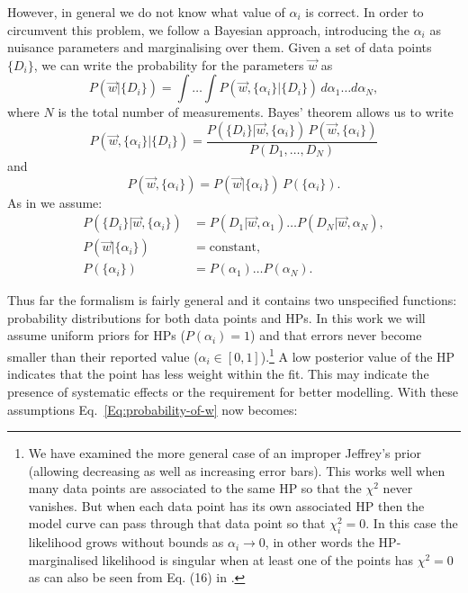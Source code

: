 However, in general we do not know what value of $\alpha_i$ is correct. In order to circumvent this problem, 
we follow a Bayesian approach, introducing the $\alpha_i$ as nuisance parameters and marginalising over them. Given a set of data points $ \lbrace D_i \rbrace$, we can write the probability for the parameters $\vec{w}$  as
\begin{equation}\label{Eq:probability-of-w}
P(\vec{w}|\lbrace D_i \rbrace) = \int \dots \int P(\vec{w},\lbrace \alpha_i \rbrace|\lbrace D_i \rbrace)\, d\alpha_1 \dots d\alpha_N,
\end{equation}
where $N$ is the total number of measurements. Bayes' theorem allows us to write 
\begin{equation}\label{Eq:probability-of-w-alphas-1}
P(\vec{w},\lbrace \alpha_i \rbrace|\lbrace D_i \rbrace) = \frac{P(\lbrace D_i \rbrace|\vec{w},\lbrace \alpha_i \rbrace)\, P(\vec{w},\lbrace \alpha_i \rbrace)}{P(D_1,\dots,D_N)}
\end{equation}
and 
\begin{equation}\label{Eq:probability-of-w-alphas-2}
P(\vec{w},\lbrace \alpha_i \rbrace) = P(\vec{w}|\lbrace \alpha_i \rbrace)\, P(\lbrace \alpha_i \rbrace).
\end{equation}
As in \cite{Lahav:1999hu} we assume:
\begin{subequations}\label{Eq:assumptions}
\begin{align}
\label{Eq:assumptions:1}
P(\lbrace D_i \rbrace|\vec{w},\lbrace \alpha_i \rbrace) & = P(D_1|\vec{w},\alpha_1)\dots P(D_N|\vec{w},\alpha_N),
\\
\label{Eq:assumptions:2}
P(\vec{w}|\lbrace \alpha_i\rbrace) & = \mathrm{constant},
\\
\label{Eq:assumptions:3}
P(\lbrace \alpha_i \rbrace) & = P(\alpha_1)\dots P(\alpha_N).
\end{align}
\end{subequations}

Thus far the formalism is fairly general and it contains two unspecified functions: probability distributions for both data points and HPs. In this work we will assume uniform priors for HPs ($P(\alpha_i)=1$) and that errors never become smaller than their reported value ($\alpha_i \in [0,1]$).\footnote{We have examined the more general case of an improper Jeffrey's prior (allowing decreasing as well as increasing error bars). This works well when many data points are associated to the same HP so that the $\chi^2$ never vanishes. But when each data point has its own associated HP then the model curve can pass through that data point so that $\chi^2_i=0$. In this case the likelihood grows without bounds as $\alpha_i\rightarrow 0$, in other words the HP-marginalised likelihood is singular when at least one of the points has $\chi^2=0$ as can also be seen from Eq. (16) in \cite{Lahav:1999hu}.} A low posterior value of the HP indicates that the point has less weight within the fit. This may indicate the presence of systematic effects or the requirement for better modelling. With these assumptions Eq.~\eqref{Eq:probability-of-w} now becomes:


